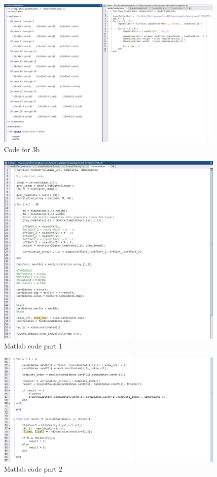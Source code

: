 \documentclass[]{article}
\begin{document}
\section{}
 \begin{figure}[h!]
  \includegraphics[width=1.32\textwidth]{img/3b.jpg}
 \caption{Code for 3b}
 \end{figure}
  \begin{figure}[h!]
   \includegraphics[width=1.32\textwidth]{img/code1.jpg}
  \caption{Matlab code part 1}
  \end{figure}
   \begin{figure}[h!]
    \includegraphics[width=1.32\textwidth]{img/code2.jpg}
   \caption{Matlab code part 2}
   \end{figure}
\end{document}
